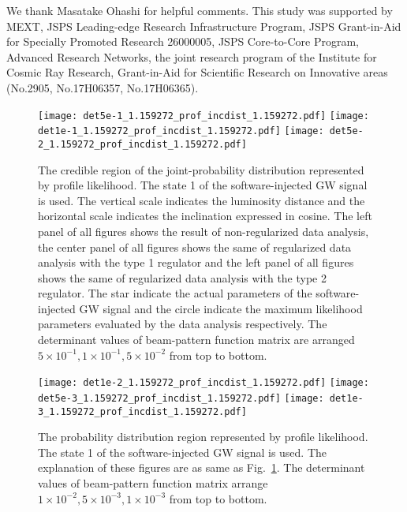 \documentclass[%
 aps,
 prd,
 amsmath,amssymb,
 reprint,%
superscriptaddress
]{revtex4-1}
\begin{document}
\begin{acknowledgments}
We thank Masatake Ohashi for helpful comments. This study was supported by MEXT, JSPS Leading-edge Research Infrastructure Program, JSPS Grant-in-Aid for Specially Promoted Research 26000005, JSPS Core-to-Core Program, Advanced Research Networks, the joint research program of the Institute for Cosmic Ray Research, Grant-in-Aid for Scientific Research on Innovative areas (No.2905, No.17H06357, No.17H06365).
\end{acknowledgments}

\nocite{*}

% 


\begin{figure*}[tb]
  \centering
   \texttt{[image: det5e-1\_1.159272\_prof\_incdist\_1.159272.pdf]}
 \texttt{[image: det1e-1\_1.159272\_prof\_incdist\_1.159272.pdf]}
    \texttt{[image: det5e-2\_1.159272\_prof\_incdist\_1.159272.pdf]}
   \caption{The credible region of the joint-probability distribution represented by profile likelihood. The state 1 of the software-injected GW signal is used. The vertical scale indicates the luminosity distance and the horizontal scale indicates the inclination expressed in cosine. The left panel of all figures shows the result of non-regularized data analysis, the center panel of all figures shows the same of regularized data analysis with the type 1 regulator and the left panel of all figures shows the same of regularized data analysis with the type 2 regulator. The star indicate the actual parameters of the software-injected GW signal and the circle indicate the maximum likelihood parameters evaluated by the data analysis respectively. The determinant values of beam-pattern function matrix are arranged $5\times10^{-1}, 1\times10^{-1}, 5\times10^{-2}$ from top to bottom.\label{ken-short_thesis-fig:8}}
\end{figure*}


\begin{figure*}[htbp]
 \centering
  \texttt{[image: det1e-2\_1.159272\_prof\_incdist\_1.159272.pdf]}
    \texttt{[image: det5e-3\_1.159272\_prof\_incdist\_1.159272.pdf]}
 \texttt{[image: det1e-3\_1.159272\_prof\_incdist\_1.159272.pdf]}
    \caption{The probability distribution region represented by profile likelihood. The state 1 of the software-injected GW signal is used. The explanation of these figures are as same as Fig.~\ref{ken-short_thesis-fig:8}. The determinant values of beam-pattern function matrix arrange $1\times10^{-2}, 5\times10^{-3}, 1\times10^{-3}$ from top to bottom.\label{ken-short_thesis-fig:9}}
\end{figure*}
\end{document}
